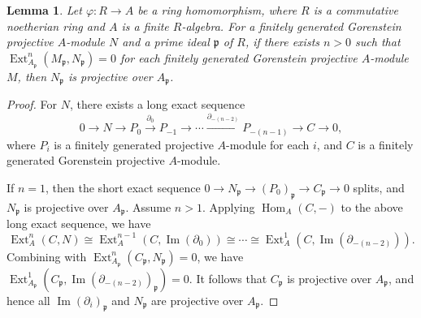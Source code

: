 \documentclass{amsart}
\newcommand{\D}{\mathsf{D}}
\newcommand{\0}{{\bf{0}}}
\newcommand{\p}{\mathfrak{p}}
\DeclareMathOperator{\Ima}{Im}
\DeclareMathOperator{\Gdim}{G-dim}
\DeclareMathOperator{\Hom}{Hom}
\DeclareMathOperator{\Ext}{Ext}
\DeclareMathOperator{\RHom}{\mathsf{RHom}}
\newtheorem{lemma}[theorem]{Lemma}
\newtheorem{corollary}[theorem]{Corollary}
\theoremstyle{definition}
\begin{document}





\begin{lemma}\label{projective}
Let $\varphi\colon R\rightarrow A$ be a ring homomorphism, where $R$ is a commutative noetherian ring and $A$ is a finite $R$-algebra. For a finitely generated Gorenstein projective  $A$-module $N$ and a prime ideal $\p$ of $R$, if there exists $n>0$ such that $\Ext^n_{A_\p}(M_\p, N_\p)=0$ for each finitely generated Gorenstein projective  $A$-module $M$, then $N_\p$ is projective over $A_\p$.
\end{lemma}

\begin{proof}
For $N$, there exists a long exact sequence
$$
 0\rightarrow N\rightarrow P_0\xrightarrow {\partial_0}P_{-1}\rightarrow \cdots\xrightarrow{\partial_{-(n-2)}} P_{-(n-1)}\rightarrow C\rightarrow 0,
$$
where $P_i$ is a finitely generated projective  $A$-module for each $i$, and $C$ is a finitely generated Gorenstein projective   $A$-module.

If $n=1$, then the short exact sequence $0\rightarrow N_\p\rightarrow (P_0)_\p\rightarrow C_\p\rightarrow 0$ splits, and $N_\p$ is projective over $A_\p$.
Assume $n>1$.  Applying $\Hom_A(C,-)$ to the above long exact sequence, we have
$$\Ext^n_A(C,N)\cong \Ext^{n-1}_A(C,\Ima(\partial_0))\cong \cdots\cong \Ext^1_A(C,\Ima (\partial_{-(n-2)})).$$
Combining with $\Ext^n_{A_\p}(C_\p, N_\p)=0$, we have $\Ext^1_{A_\p}(C_\p,\Ima (\partial_{-(n-2)})_\p)=0$. 
It follows that $C_\p$ is projective over $A_\p$, and hence all $\Ima (\partial_i)_\p$ and $N_\p$ are projective over $A_\p$.
\end{proof}
\end{document}
